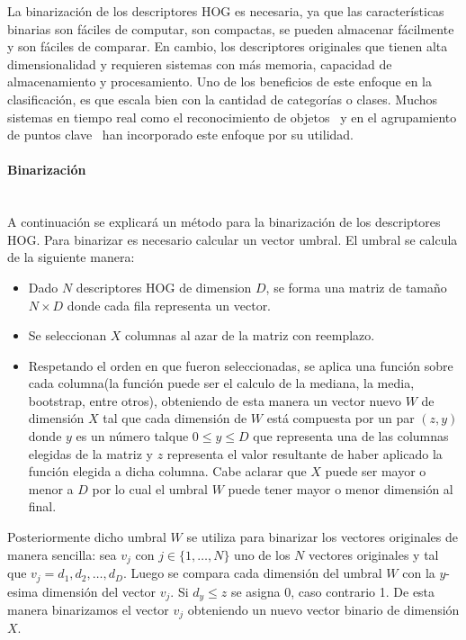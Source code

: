 	La binarización de los descriptores HOG es necesaria, ya que las características binarias son fáciles de computar, son compactas, se pueden almacenar fácilmente y son fáciles de comparar. En cambio, los descriptores originales que tienen alta dimensionalidad y requieren sistemas con más memoria, capacidad de almacenamiento y procesamiento. Uno de los beneficios de este enfoque en la clasificación, es que escala bien con la cantidad de categorías o clases. Muchos sistemas en tiempo real como el reconocimiento de objetos~\cite{SJC08} y en el agrupamiento de puntos clave~\cite{OFL07} han incorporado este enfoque por su utilidad.

	
	\paragraph{Binarización} ~\\
		
		A continuación se explicará un método para la binarización de los descriptores HOG. Para binarizar es necesario calcular un vector umbral. El umbral se calcula de la siguiente manera:
		\begin{itemize}
			\item Dado $N$ descriptores HOG de dimension $D$, se forma una matriz de tamaño $N \times D$ donde cada fila representa un vector.
			\item Se seleccionan $X$ columnas al azar de la matriz con reemplazo.
			\item Respetando el orden en que fueron seleccionadas, se aplica una función sobre cada columna(la función puede ser el calculo de la mediana, la media, bootstrap, entre otros), obteniendo de esta manera un vector nuevo $W$ de dimensión $X$ tal que cada dimensión de $W$ está compuesta por un par $(z,y)$ donde $y$ es un número talque $0 \leq y \leq D$ que representa una de las columnas elegidas de la matriz y $z$ representa el valor resultante de haber aplicado la función elegida a dicha columna. Cabe aclarar que $X$ puede ser mayor o menor a $D$ por lo cual el umbral $W$ puede tener mayor o menor dimensión al final.
		\end{itemize}
		Posteriormente dicho umbral $W$ se utiliza para binarizar los vectores originales de manera sencilla: sea $v_j$ con $j \in \{1,\dots,N\}$ uno de los $N$ vectores originales y tal que $v_j = d_1,d_2,\dots,d_D$. Luego se compara cada dimensión del umbral $W$ con la $y$-esima dimensión del vector $v_j$. Si $d_y \leq z$ se asigna 0, caso contrario 1. De esta manera binarizamos el vector $v_j$ obteniendo un nuevo vector binario de dimensión $X$.


